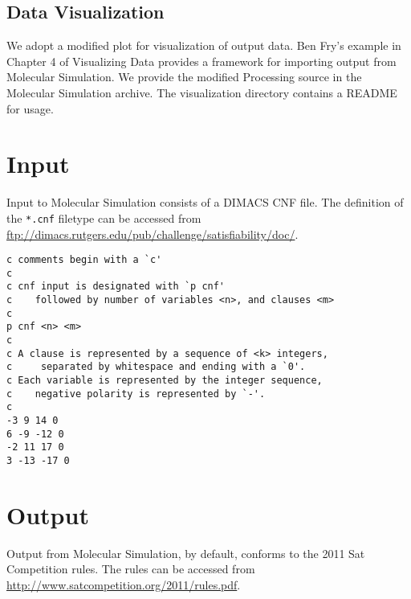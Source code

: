 			
			
		\subsection{Data Visualization}
		

We adopt a modified plot for visualization of output data.  Ben Fry's example in Chapter 4 of Visualizing Data\cite{fryVisualizingData} provides a framework for importing output from Molecular Simulation.  We provide the modified Processing source in the Molecular Simulation archive.  The visualization directory contains a README for usage.

			
	\section{Input}
	\label{inputSection}
	

Input to Molecular Simulation consists of a DIMACS CNF file. The definition of the \texttt{*.cnf} filetype can be accessed from \url{ftp://dimacs.rutgers.edu/pub/challenge/satisfiability/doc/}.		

\begin{verbatim}
c comments begin with a `c'
c
c cnf input is designated with `p cnf'
c    followed by number of variables <n>, and clauses <m>
c
p cnf <n> <m>
c
c A clause is represented by a sequence of <k> integers,
c     separated by whitespace and ending with a `0'.
c Each variable is represented by the integer sequence, 
c    negative polarity is represented by `-'.
c
-3 9 14 0
6 -9 -12 0
-2 11 17 0
3 -13 -17 0
\end{verbatim}
		
	\section{Output}
	\label{outputSection}
	

Output from Molecular Simulation, by default, conforms to the 2011 Sat Competition rules.  The rules can be accessed from \url{http://www.satcompetition.org/2011/rules.pdf}.


